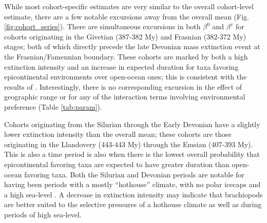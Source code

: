 \documentclass{article}
\begin{document}
While most cohort-specific estimates are very similar to the overall cohort-level estimate, there are a few notable excursions away from the overall mean (Fig. \ref{fig:cohort_series}). There are simultaneous excursions in both \(\beta^{0}\) and \(\beta^{v}\) for cohorts originating in the Givetian (387-382 My) and Frasnian (382-372 My) stages; both of which directly precede the late Devonian mass extinction event at the Frasnian/Famennian boundary. These cohorts are marked by both a high extinction intensity and an increase in expected duration for taxa favoring epicontinental environments over open-ocean ones; this is consistent with the results of \citet{Miller2009a}. Interestingly, there is no corresponding excursion in the effect of geographic range or for any of the interaction terms involving environmental preference (Table \ref{tab:param}).

Cohorts originating from the Silurian through the Early Devonian have a slightly lower extinction intensity than the overall mean; these cohorts are those originating in the Llandovery (443-443 My) through the Emsian (407-393 My). This is also a time period is also when there is the lowest overall probability that epicontinental favoring taxa are expected to have greater duration than open-ocean favoring taxa. Both the Silurian and Devonian periods are notable for having been periods with a mostly ``hothouse'' climate, with no polar icecaps and a high sea-level \citep{Edwards1985,Joachimski2009,Munnecke2010}. A decrease in extinction intensity may indicate that brachiopods are better suited to the selective pressures of a hothouse climate as well as during periods of high sea-level.

\end{document}
